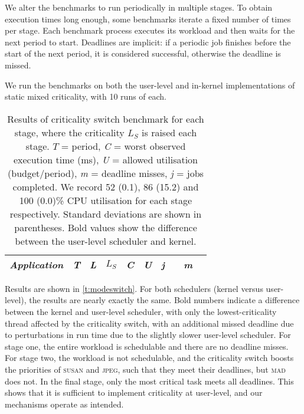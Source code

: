 We alter the benchmarks to run periodically in multiple stages. To obtain
execution times long enough, some benchmarks iterate a fixed number of times per
stage. Each benchmark process executes its workload and then waits for the next period to start.
Deadlines are implicit: if a periodic job finishes before the start of the next period, it is
considered successful, otherwise the deadline is missed.

We run the benchmarks on both the user-level and in-kernel implementations of static mixed criticality, with 10 runs of each.

\begin{table}[t]
    \centering
    \begin{tabular}{lcccccclcl}\toprule
        \emph{Application} & \emph{T} & \emph{L} & \emph{\(L_S\)} & \emph{C} & \emph{U} & \emph{j} &
        & \emph{m}  & \\\midrule
        
        \bottomrule
    \end{tabular}
    \caption[Results of criticality switch benchmark.]{Results of criticality switch benchmark for each
        stage, where the  criticality \(L_S\) is raised each stage. \(T\) =
        period, \textit{C} = worst observed execution time (ms),
      \textit{U} = allowed utilisation (budget/period),
      \textit{m} = deadline misses, \textit{j} = jobs completed. We record 52 (0.1), 86 (15.2)
      and 100 (0.0)\% CPU
utilisation for each stage respectively. Standard deviations are shown in parentheses. Bold values
show the difference between the user-level scheduler and kernel. }
    \label{t:modeswitch}
\end{table}


Results are shown in \autoref{t:modeswitch}. For both schedulers (kernel versus user-level), 
the results are nearly exactly the same. Bold numbers indicate a difference between the kernel and
user-level scheduler, with only the lowest-criticality thread affected by the criticality switch, with an additional missed deadline due to
perturbations in run time due to the slightly slower user-level scheduler.
For stage one, the entire workload is schedulable and
there are no deadline misses. For stage two, the workload is not
schedulable, and the criticality switch boosts the priorities of
\textsc{susan} and \textsc{jpeg}, such that they meet
their deadlines, but
\textsc{mad} does not. In the final stage, only the most critical task
meets all deadlines.
This shows that it is sufficient to implement criticality at user-level, and our mechanisms operate as intended.

